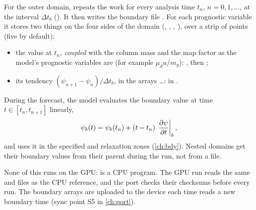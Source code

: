 For the outer domain,  repeats the work for every analysis time $t_n$, $n = 0, 1, \dots$, at the
interval $\Delta t_b$ (). It then writes the boundary file . For each
prognostic variable it stores two things on the four sides of the domain (, , ,
), over a strip of  points (five by default):
\begin{itemize}
  \item the value at $t_n$, \emph{coupled} with the column mass and the map factor as the model's prognostic variables
    are (for example $\mu_d u/m_y$): , then ;
  \item its tendency $(\psi_{n+1} - \psi_n)/\Delta t_b$, in the arrays  \dots: 
    in .
\end{itemize}
During the forecast, the model evaluates the boundary value at time $t \in [t_n, t_{n+1}]$ linearly,
\begin{equation}
  \psi_b(t) = \psi_b(t_n) + (t - t_n)\,\left.\frac{\partial \psi}{\partial t}\right|_b ,
\end{equation}
and uses it in the specified and relaxation zones (\cref{ch:bdy}). Nested domains get their boundary values from
their parent during the run, not from a file.

\begin{portnote}
None of this runs on the GPU:  is a CPU program. The GPU run reads the same  and
 files as the CPU reference, and the port checks their checksums before every run. The boundary arrays
are uploaded to the device each time  reads a new boundary time (sync point S5 in \cref{ch:port}).
\end{portnote}
